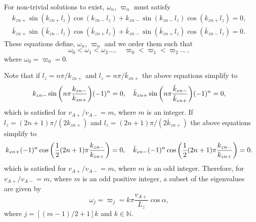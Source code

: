 For non-trivial solutions to exist, $\omega_n$, $\varpi_n$ must satisfy
\begin{gather}
\label{eq:omega_n_eqn}
k_{zn+}\sin(k_{zn+}l_z)\cos(k_{zn-}l_z)+k_{zn-}\sin(k_{zn-}l_z)\cos(k_{zn+}l_z)=0, \\
\label{eq:varpi_n_eqn}
\bar{k}_{zn+}\sin(\bar{k}_{zn-}l_z)\cos(\bar{k}_{zn+}l_z)+\bar{k}_{zn-}\sin(\bar{k}_{zn+}l_z)\cos(\bar{k}_{zn-}l_z)=0.
\end{gather}
These equations define, $\omega_n$, $\varpi_n$ and we order them such that
\begin{equation}
    \omega_0<\omega_1<\omega_2...,\quad \varpi_0<\varpi_1<\varpi_2...\,,
\end{equation}
where $\omega_0=\varpi_0=0$.

Note that if $l_z=n\pi/k_{zn+}$ and $l_z=n\pi/\bar{k}_{zn+}$ the above equations simplify to
\[k_{zn-}\sin\qty(n\pi\frac{k_{zn-}}{k_{zn+}})(-1)^n=0,\quad \bar{k}_{zn+}\sin\qty(n\pi\frac{\bar{k}_{zn-}}{\bar{k}_{zn+}})(-1)^n=0,\]
which is satisfied for $v_{A+}/v_{A-}=m$, where $m$ is an integer.
If $l_z=(2n+1)\pi/(2k_{zn+})$ and $l_z=(2n+1)\pi/(2\bar{k}_{zn+})$ the above equations simplify to
\[k_{zn+}(-1)^n\cos\qty(\frac{1}{2}(2n+1)\pi\frac{k_{zn-}}{k_{zn+}})=0,\quad
\bar{k}_{zn-}(-1)^n\cos\qty(\frac{1}{2}(2n+1)\pi\frac{k_{zn-}}{k_{zn+}})=0.\]
which is satisfied for $v_{A+}/v_{A-}=m$, where $m$ is an odd integer. Therefore, for $v_{A+}/v_{A-}=m$, where $m$ is an odd positive integer, a subset of the eigenvalues are given by
\begin{equation}
    \label{eq:eigenfrequencies_for_odd_integer}
    \omega_j=\varpi_j=k\pi\frac{v_{A+}}{L_z}\cos\alpha,
\end{equation}
where $j = [(m-1)/2 + 1]k$ and $k\in\mathds{N}$.

